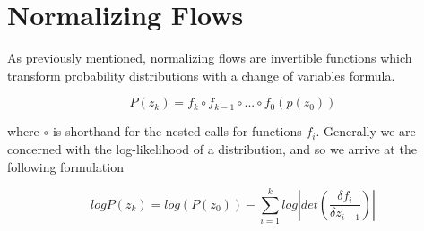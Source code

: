 


\section{Normalizing Flows}

As previously mentioned, normalizing flows are invertible functions which transform probability distributions with a change of variables formula.

\begin{equation}
	P(z_{k}) = f_{k} \circ f_{k-1} \circ ... \circ f_{0}(p(z_{0}))
\end{equation} 

where $\circ$ is shorthand for the nested calls for functions $f_{i}$. Generally we are concerned with the log-likelihood of a distribution, and so we arrive at the following formulation



\begin{equation}
	logP(z_{k}) = log(P(z_{0})) - \sum_{i=1}^{k} log |det (\frac{\delta f_{i}}{\delta z_{i-1}}) |
\end{equation}

